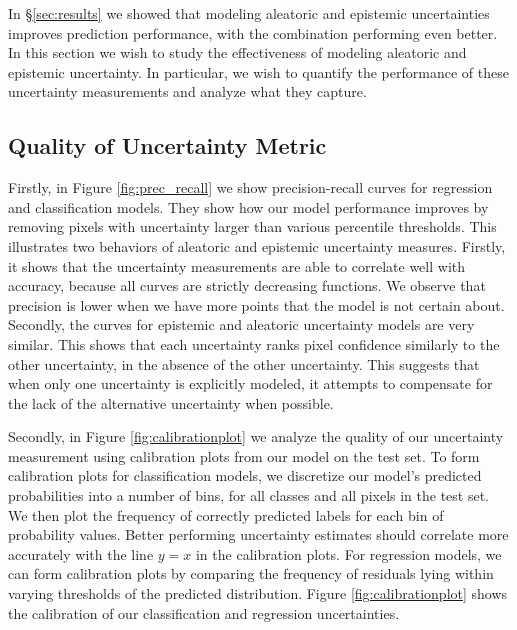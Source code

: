 \documentclass{article}
\begin{document}
In \S\ref{sec:results} we showed that modeling aleatoric and epistemic uncertainties improves prediction performance, with the combination performing even better.
In this section we wish to study the effectiveness of modeling aleatoric and epistemic uncertainty. In particular, we wish to quantify the performance of these uncertainty measurements and analyze what they capture.

\subsection{Quality of Uncertainty Metric}



Firstly, in Figure \ref{fig:prec_recall} we show precision-recall curves for regression and classification models. They show how our model performance improves by removing pixels with uncertainty larger than various percentile thresholds. This illustrates two behaviors of aleatoric and epistemic uncertainty measures. Firstly, it shows that the uncertainty measurements are able to correlate well with accuracy, because all curves are strictly decreasing functions. We observe that precision is lower when we have more points that the model is not certain about. Secondly, the curves for epistemic and aleatoric uncertainty models are very similar. This shows that each uncertainty ranks pixel confidence similarly to the other uncertainty, in the absence of the other uncertainty. This suggests that when only one uncertainty is explicitly modeled, it attempts to compensate for the lack of the alternative uncertainty when possible.

Secondly, in Figure \ref{fig:calibrationplot} we analyze the quality of our uncertainty measurement using calibration plots from our model on the test set. To form calibration plots for classification models, we discretize our model’s predicted probabilities into a number of bins, for all classes and all pixels in the test set. We then plot the frequency of correctly predicted labels for each bin of probability values. Better performing uncertainty estimates should correlate more accurately with the line $y=x$ in the calibration plots. For regression models, we can form calibration plots by comparing the frequency of residuals lying within varying thresholds of the predicted distribution. Figure \ref{fig:calibrationplot} shows the calibration of our classification and regression uncertainties.
\end{document}

